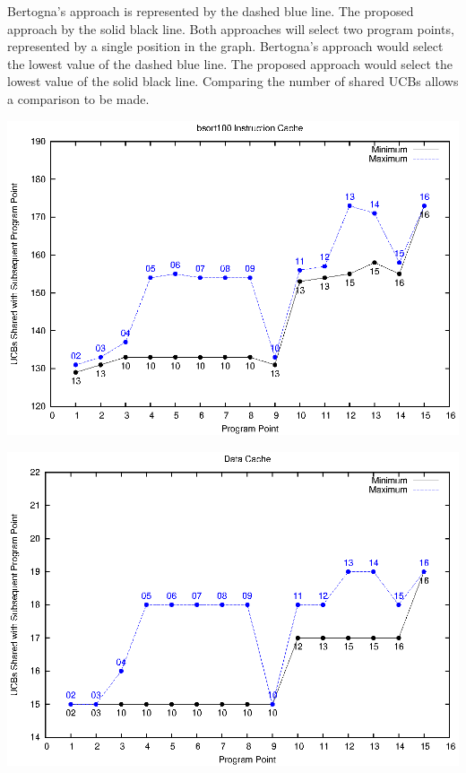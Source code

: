Bertogna's approach is represented by the dashed blue line. The proposed
approach by the solid black line. Both approaches will select two
program points, represented by a single position in the
graph. Bertogna's approach would select the lowest value of the dashed
blue line. The proposed approach would select the lowest value of the
solid black line. Comparing the number of shared UCBs allows a
comparison to be made.

\begin{center}
  \includegraphics[width=\linewidth]{eps/bsort-icache.eps}
\end{center}

\begin{center}
  \includegraphics[width=\linewidth]{eps/bsort-dcache.eps}
\end{center}

